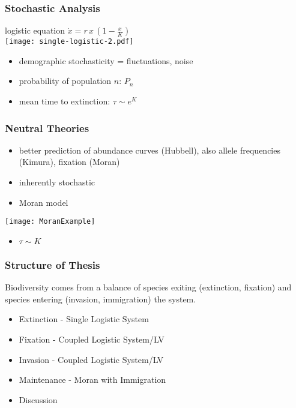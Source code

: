 \documentclass{beamer}
\begin{document}
\begin{frame}
\frametitle{Stochastic Analysis}
\centering
logistic equation $\dot{x} = r \, x \, \left(1-\frac{x}{K}\right)$ \\
\texttt{[image: single-logistic-2.pdf]}
\begin{itemize}
	\item demographic stochasticity = fluctuations, noise
	\pause
	\item probability of population $n$: $P_n$
	\item mean time to extinction: $\tau \sim e^K$ %
\end{itemize}
\end{frame}


\begin{frame}
\frametitle{Neutral Theories}
\begin{itemize}
	\item better prediction of abundance curves (Hubbell), also allele frequencies (Kimura), fixation (Moran)
	\item inherently stochastic
	\pause
	\item Moran model
\end{itemize}
\centering
\texttt{[image: MoranExample]}
\begin{itemize}
	\item $\tau \sim K$
\end{itemize}
\end{frame}


\begin{frame}
\frametitle{Structure of Thesis}
Biodiversity comes from a balance of species exiting (extinction, fixation) and species entering (invasion, immigration) the system.
\begin{itemize}
	\item Extinction - Single Logistic System
	\item Fixation - Coupled Logistic System/LV
	\item Invasion - Coupled Logistic System/LV
	\item Maintenance - Moran with Immigration
	\item Discussion
\end{itemize}
\end{frame}
\end{document}
